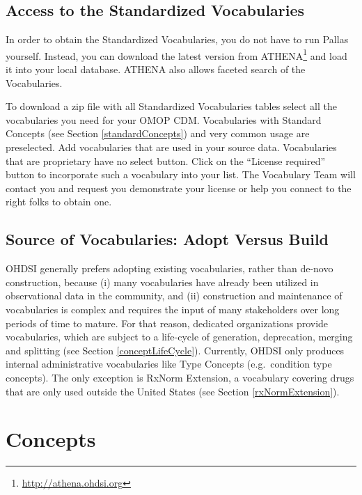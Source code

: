 \documentclass[11pt]{book}
\let\rmarkdownfootnote\footnote%
\def\footnote{\protect\rmarkdownfootnote}
\theoremstyle{definition}
\theoremstyle{definition}
\theoremstyle{definition}
\theoremstyle{remark}
\begin{document}
\subsection{Access to the Standardized
Vocabularies}\label{accessVocabularies}

In order to obtain the Standardized Vocabularies, you do not have to run
Pallas yourself. Instead, you can download the latest version from
ATHENA\footnote{\url{http://athena.ohdsi.org}} and load it into your
local database. ATHENA also allows faceted search of the Vocabularies.
 

To download a zip file with all Standardized Vocabularies tables select
all the vocabularies you need for your OMOP CDM. Vocabularies with
Standard Concepts (see Section \ref{standardConcepts}) and very common
usage are preselected. Add vocabularies that are used in your source
data. Vocabularies that are proprietary have no select button. Click on
the ``License required'' button to incorporate such a vocabulary into
your list. The Vocabulary Team will contact you and request you
demonstrate your license or help you connect to the right folks to
obtain one.

\subsection{Source of Vocabularies: Adopt Versus
Build}\label{source-of-vocabularies-adopt-versus-build}

OHDSI generally prefers adopting existing vocabularies, rather than
de-novo construction, because (i) many vocabularies have already been
utilized in observational data in the community, and (ii) construction
and maintenance of vocabularies is complex and requires the input of
many stakeholders over long periods of time to mature. For that reason,
dedicated organizations provide vocabularies, which are subject to a
life-cycle of generation, deprecation, merging and splitting (see
Section \ref{conceptLifeCycle}). Currently, OHDSI only produces internal
administrative vocabularies like Type Concepts (e.g.~condition type
concepts). The only exception is RxNorm Extension, a vocabulary covering
drugs that are only used outside the United States (see Section
\ref{rxNormExtension}).

\section{Concepts}\label{concepts}
\end{document}
